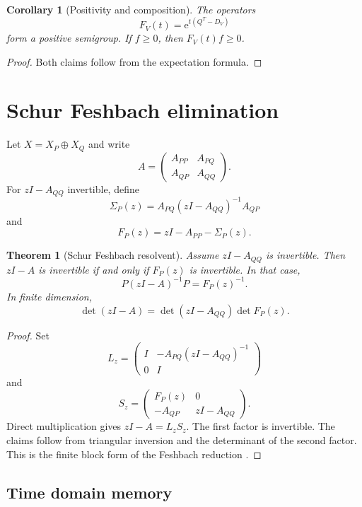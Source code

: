 \documentclass{aomart}
\newtheorem{theorem}{Theorem}[section]
\newtheorem{corollary}[corollary]{Corollary}
\theoremstyle{definition}
\theoremstyle{remark}
\newcommand{\e}{\mathrm e}
\begin{document}
\begin{corollary}[Positivity and composition]\label{cor:feynman_kac_semigroup}
The operators
\[
F_V(t)=\e^{t(Q^T-D_V)}
\]
form a positive semigroup. If \(f\geq0\), then \(F_V(t)f\geq0\).
\end{corollary}

\begin{proof}
Both claims follow from the expectation formula.
\end{proof}

\section{Schur Feshbach elimination}\label{sec:feshbach}

Let \(X=X_P\oplus X_Q\) and write
\[
A=
\begin{pmatrix}
A_{PP}&A_{PQ}\\
A_{QP}&A_{QQ}
\end{pmatrix}.
\]
For \(zI-A_{QQ}\) invertible, define
\[
\Sigma_P(z)
=
A_{PQ}(zI-A_{QQ})^{-1}A_{QP}
\]
and
\[
F_P(z)
=
zI-A_{PP}-\Sigma_P(z).
\]

\begin{theorem}[Schur Feshbach resolvent]\label{thm:feshbach_resolvent}
Assume \(zI-A_{QQ}\) is invertible. Then \(zI-A\) is invertible if and only if \(F_P(z)\) is invertible. In that case,
\[
P(zI-A)^{-1}P
=
F_P(z)^{-1}.
\]
In finite dimension,
\[
\det(zI-A)
=
\det(zI-A_{QQ})\det F_P(z).
\]
\end{theorem}

\begin{proof}
Set
\[
L_z=
\begin{pmatrix}
I&-A_{PQ}(zI-A_{QQ})^{-1}\\
0&I
\end{pmatrix}
\]
and
\[
S_z=
\begin{pmatrix}
F_P(z)&0\\
-A_{QP}&zI-A_{QQ}
\end{pmatrix}.
\]
Direct multiplication gives \(zI-A=L_zS_z\). The first factor is invertible. The claims follow from triangular inversion and the determinant of the second factor. This is the finite block form of the Feshbach reduction \cite{Feshbach1958}.
\end{proof}

\subsection{Time domain memory}
\end{document}
